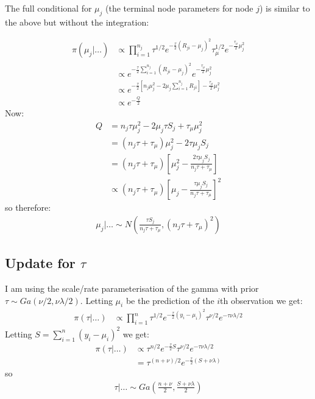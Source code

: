 \documentclass{article}
\begin{document}
The full conditional for $\mu_{j}$ (the terminal node parameters for node $j$) is similar to the above but without the integration:

\begin{align*}
\pi(\mu_{j}|\ldots)  &\propto \prod_{i=1}^{n_j}  \tau^{1/2} e^{-\frac{\tau}{2} (R_{ji} - \mu_{j})^2} \tau_{\mu}^{1/2} e^{-\frac{\tau_\mu}{2} \mu_{j}^2 }\\
&\propto e^{-\frac{\tau}{2} \sum_{i=1}^{n_j} (R_{ji} - \mu_{j})^2} e^{-\frac{\tau_\mu}{2} \mu_{j}^2 } \\ 
&\propto e^{-\frac{\tau}{2} \left[ n_j \mu_{j}^2 - 2 \mu_j  \sum_{i=1}^{n_j} R_{ji} \right] - \frac{\tau_\mu}{2} \mu_j^2}\\
&\propto e^{-\frac{Q}{2}}
\end{align*}
Now:
\begin{align*}
Q &= n_j \tau \mu_j^2 - 2\mu_j \tau S_j + \tau_\mu \mu_j^2\\
&= (n_j \tau + \tau_\mu) \mu_j^2 - 2 \tau \mu_j S_j \\
&= (n_j \tau + \tau_\mu) \left[ \mu_j^2 - \frac{2 \tau \mu_j S_j}{n_j \tau + \tau_\mu} \right] \\
&\propto (n_j \tau + \tau_\mu) \left[ \mu_j - \frac{\tau \mu_j S_j}{n_j \tau + \tau_\mu} \right]^2
\end{align*}
so therefore:
\begin{align*}
\mu_j| \ldots \sim N \left( \frac{\tau S_j}{n_j \tau + \tau_\mu} , (n_j \tau + \tau_\mu)^2 \right)
\end{align*}

\subsection*{Update for $\tau$}

I am using the scale/rate parameterisation of the gamma with prior $\tau \sim Ga(\nu/2, \nu \lambda / 2)$. Letting $\mu_i$ be the prediction of the $i$th observation we get:
\begin{align*}
\pi(\tau | \ldots) &\propto \prod_{i=1}^n \tau^{1/2} e^{-\frac{\tau}{2} (y_i - \mu_i)^2} \tau^{\nu/2} e^{-\tau \nu \lambda / 2}
\end{align*}
Letting $S = \sum_{i=1}^n (y_i - \mu_i)^2$ we get:
\begin{align*}
\pi(\tau | \ldots) &\propto \tau^{n/2} e^{-\frac{\tau}{2} S} \tau^{\nu/2} e^{-\tau \nu \lambda / 2}\\
&= \tau^{(n + \nu)/2} e^{-\frac{\tau}{2} (S + \nu \lambda)}
\end{align*}
so
\begin{align*}
\tau | \ldots \sim Ga \left( \frac{n + \nu}{2}, \frac{S + \nu \lambda}{2} \right)
\end{align*}
\end{document}
